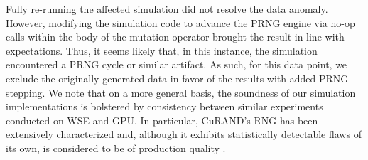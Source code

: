 Fully re-running the affected simulation did not resolve the data anomaly.
However, modifying the simulation code to advance the PRNG engine via no-op calls within the body of the mutation operator brought the result in line with expectations.
Thus, it seems likely that, in this instance, the simulation encountered a PRNG cycle or similar artifact.
As such, for this data point, we exclude the originally generated data in favor of the results with added PRNG stepping.
We note that on a more general basis, the soundness of our simulation implementations is bolstered by consistency between similar experiments conducted on WSE and GPU.
In particular, CuRAND's RNG has been extensively characterized and, although it exhibits statistically detectable flaws of its own, is considered to be of production quality \cite{nvidia2024curand}.

% 





